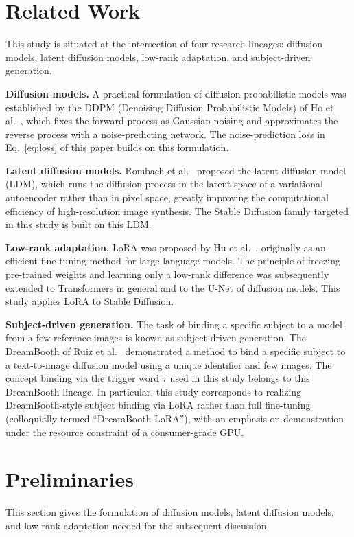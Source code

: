 \documentclass[10pt,twocolumn]{article}
\begin{document}
\section{Related Work}
This study is situated at the intersection of four research lineages: diffusion models, latent diffusion models, low-rank adaptation, and subject-driven generation.

\textbf{Diffusion models.} A practical formulation of diffusion probabilistic models was established by the DDPM (Denoising Diffusion Probabilistic Models) of Ho et al.~\cite{ho2020ddpm}, which fixes the forward process as Gaussian noising and approximates the reverse process with a noise-predicting network. The noise-prediction loss in Eq.~\eqref{eq:loss} of this paper builds on this formulation.

\textbf{Latent diffusion models.} Rombach et al.~\cite{rombach2022ldm} proposed the latent diffusion model (LDM), which runs the diffusion process in the latent space of a variational autoencoder rather than in pixel space, greatly improving the computational efficiency of high-resolution image synthesis. The Stable Diffusion family targeted in this study is built on this LDM.

\textbf{Low-rank adaptation.} LoRA was proposed by Hu et al.~\cite{hu2022lora}, originally as an efficient fine-tuning method for large language models. The principle of freezing pre-trained weights and learning only a low-rank difference was subsequently extended to Transformers in general and to the U-Net of diffusion models. This study applies LoRA to Stable Diffusion.

\textbf{Subject-driven generation.} The task of binding a specific subject to a model from a few reference images is known as subject-driven generation. The DreamBooth of Ruiz et al.~\cite{ruiz2023dreambooth} demonstrated a method to bind a specific subject to a text-to-image diffusion model using a unique identifier and few images. The concept binding via the trigger word $\tau$ used in this study belongs to this DreamBooth lineage. In particular, this study corresponds to realizing DreamBooth-style subject binding via LoRA rather than full fine-tuning (colloquially termed ``DreamBooth-LoRA''), with an emphasis on demonstration under the resource constraint of a consumer-grade GPU.

\section{Preliminaries}
This section gives the formulation of diffusion models, latent diffusion models, and low-rank adaptation needed for the subsequent discussion.
\end{document}
